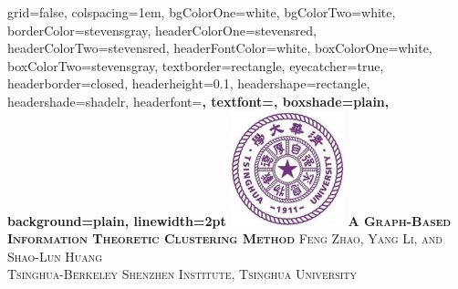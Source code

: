 \documentclass[portrait,final,a0paper,fontscale=0.3]{baposter}
\begin{document}


\begin{poster}%
  {
  grid=false,
  colspacing=1em,
  bgColorOne=white,
  bgColorTwo=white,
  borderColor=stevensgray,
  headerColorOne=stevensred,
  headerColorTwo=stevensred,
  headerFontColor=white,
  boxColorOne=white,
  boxColorTwo=stevensgray,
  textborder=rectangle,
  eyecatcher=true,
  headerborder=closed,
  headerheight=0.1\textheight,
  headershape=rectangle,
  headershade=shadelr,
  headerfont=\Large\bf\textsc, %
  textfont={\setlength{\parindent}{1.5em}},
  boxshade=plain,
  background=plain,
  linewidth=2pt
  }
  {
  		\includegraphics[height=9.0em]{thu.jpg}
  } %
  {\bf \textsc{ A Graph-Based Information Theoretic Clustering Method} }
  {\textsc{  Feng Zhao, Yang Li, and Shao-Lun Huang \\ Tsinghua-Berkeley Shenzhen Institute, Tsinghua University}}
  {%
  }


\end{poster}
\end{document}
